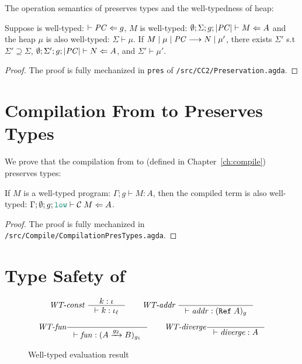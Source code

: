 The operation semantics of \CC preserves types and the well-typedness of heap:

\begin{theorem}[Preservation]
\label{thm:preservation}
Suppose \PC is well-typed:  $\vdash \mathit{PC} \Leftarrow g$,
$M$ is well-typed: $\emptyset ; \Sigma ; g ; |\mathit{PC}| \vdash M \Leftarrow A$
and the heap $\mu$ is also well-typed: $\Sigma \vdash \mu$.
If ${M}\mid{\mu}\mid{\ensuremath{\mathit{PC}}}\longrightarrow{N}\mid{\mu'}$, there exists $\Sigma'$ s.t
$\Sigma' \supseteq \Sigma$, $\emptyset ; \Sigma' ; g ; |\mathit{PC}| \vdash N \Leftarrow A$,
and $\Sigma' \vdash \mu'$.
\end{theorem}
\begin{proof}
  The proof is fully mechanized in \texttt{pres} of \texttt{/src/CC2/Preservation.agda}.
\end{proof}

\section{Compilation From \CC to \Surface Preserves Types}
\label{sec:compile-pres}

We prove that the compilation from \Surface to \CC (defined in
Chapter~\ref{ch:compile}) preserves types:

\begin{theorem}
  \label{thm:compile-pres}
  If $M$ is a well-typed \Surface program: $\Gamma ; g \vdash M : A$, then the
  compiled \CC term is also well-typed: $\Gamma ; \emptyset ; g ; \low \vdash
  \compile{M} \Leftarrow A$.
\end{theorem}
\begin{proof}
  The proof is fully mechanized in
  \texttt{/src/Compile/CompilationPresTypes.agda}.
\end{proof}

\section{Type Safety of \Surface}
\label{sec:surface-type-safety}

\begin{figure}[tbp]
  \raggedright
  \begin{gather*}
    \textit{WT-const}~
    \inference{k : \iota}{\vdash k : \iota_{\ell}}
    \qquad
    \textit{WT-addr}~
    \inference{}{\vdash \mathit{addr} : (\Refer{A})_{g}}
    \\[1ex]
    \textit{WT-fun}
    \inference{}{\vdash \mathit{fun} : (\Fun{A}{g_2}{B})_{g_1}}
    \qquad
    \textit{WT-diverge}
    \inference{}{\vdash \mathit{diverge} : A}
  \end{gather*}
  \caption{Well-typed evaluation result}
  \label{fig:wt-result}
\end{figure}

